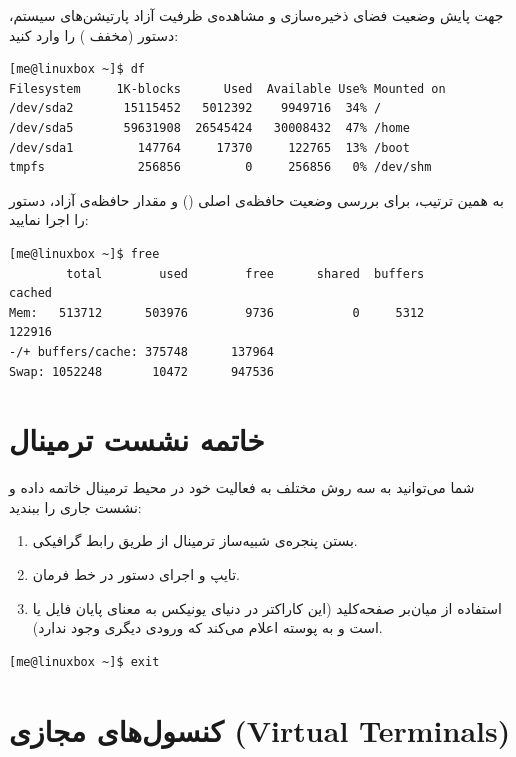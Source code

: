 جهت پایش وضعیت فضای ذخیره‌سازی و مشاهده‌ی ظرفیت آزاد پارتیشن‌های سیستم، دستور  (مخفف ) را وارد کنید:

\begin{latin}
\begin{lstlisting}
[me@linuxbox ~]$ df
Filesystem     1K-blocks      Used  Available Use% Mounted on
/dev/sda2       15115452   5012392    9949716  34% /
/dev/sda5       59631908  26545424   30008432  47% /home
/dev/sda1         147764     17370     122765  13% /boot
tmpfs             256856         0     256856   0% /dev/shm
\end{lstlisting}
\end{latin}

به همین ترتیب، برای بررسی وضعیت حافظه‌ی اصلی () و مقدار حافظه‌ی آزاد، دستور  را اجرا نمایید:

\begin{latin}
\begin{lstlisting}
[me@linuxbox ~]$ free
        total        used        free      shared  buffers       cached
Mem:   513712      503976        9736           0     5312       122916
-/+ buffers/cache: 375748      137964
Swap: 1052248       10472      947536
\end{lstlisting}
\end{latin}

\section{خاتمه نشست ترمینال}

شما می‌توانید به سه روش مختلف به فعالیت خود در محیط ترمینال خاتمه داده و نشست جاری را ببندید:
\begin{enumerate}
  \item بستن پنجره‌ی شبیه‌ساز ترمینال از طریق رابط گرافیکی.
  \item تایپ و اجرای دستور  در خط فرمان.
  \item استفاده از میان‌بر صفحه‌کلید  (این کاراکتر در دنیای یونیکس به معنای پایان فایل یا  است و به پوسته اعلام می‌کند که ورودی دیگری وجود ندارد).
\end{enumerate}

\begin{latin}
\begin{lstlisting}
[me@linuxbox ~]$ exit
\end{lstlisting}
\end{latin}

\section{کنسول‌های مجازی (Virtual Terminals)}

